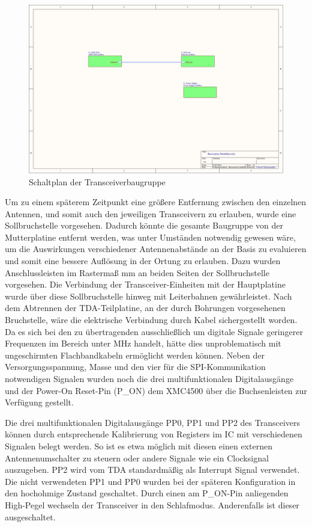 \begin{figure}[h]
\centering
\includegraphics[width=\linewidth,page=4]{"../../Altium/mobile Basisstation/Project Outputs for mobile Basisstation/Basisstation Schematics"}
\caption{Schaltplan der Transceiverbaugruppe}
\label{fig:schemTDA}
\end{figure}

Um zu einem späterem Zeitpunkt eine größere Entfernung zwischen den einzelnen Antennen, und somit auch den jeweiligen Transceivern zu erlauben, wurde eine Sollbruchstelle vorgesehen. Dadurch könnte die gesamte Baugruppe von der Mutterplatine entfernt werden, was unter Umständen notwendig gewesen wäre, um die Auswirkungen verschiedener Antennenabstände an der Basis zu evaluieren und somit eine bessere Auflösung in der Ortung zu erlauben. Dazu wurden Anschlussleisten im Rastermaß \unit[2,54]{mm} an beiden Seiten der Sollbruchstelle vorgesehen. Die Verbindung der Transceiver-Einheiten mit der Hauptplatine wurde über diese Sollbruchstelle hinweg mit Leiterbahnen gewährleistet. Nach dem Abtrennen der TDA-Teilplatine, an der durch Bohrungen vorgesehenen Bruchstelle, wäre die elektrische Verbindung durch Kabel sichergestellt worden. Da es sich bei den zu übertragenden ausschließlich um digitale Signale  geringerer Frequenzen im Bereich unter \unit[1]{MHz} handelt, hätte dies unproblematisch mit ungeschirmten Flachbandkabeln ermöglicht werden können. Neben der Versorgungsspannung, Masse und den vier für die \ac{SPI}-Kommunikation notwendigen Signalen wurden noch die drei multifunktionalen Digitalausgänge und der Power-On Reset-Pin (P\_ON) dem XMC4500 über die Buchsenleisten zur Verfügung gestellt.



Die drei multifunktionalen Digitalausgänge PP0, PP1 und PP2 des Transceivers können durch entsprechende Kalibrierung von Registers im \ac{IC} mit verschiedenen Signalen belegt werden. So  ist es etwa möglich mit diesen einen externen Antennenumschalter zu steuern oder andere Signale wie ein Clocksignal auszugeben. PP2 wird vom TDA standardmäßig als Interrupt Signal verwendet. Die nicht verwendeten PP1 und PP0 wurden bei der späteren Konfiguration in den hochohmige Zustand geschaltet. Durch einen am  P\_ON-Pin anliegenden High-Pegel wechseln der Transceiver in den Schlafmodus. Anderenfalls ist dieser ausgeschaltet. 

